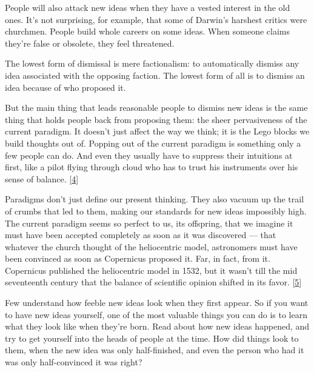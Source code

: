 People will also attack
                  new ideas when they have a vested interest in the old ones.
                  It's not surprising, for example, that some of Darwin's
                  harshest critics were churchmen. People build whole careers on
                  some ideas. When someone claims they're false or obsolete,
                  they feel threatened.

The lowest form of dismissal
                  is mere factionalism: to automatically dismiss any idea
                  associated with the opposing faction. The lowest form of all
                  is to dismiss an idea because of who proposed it.

But
                  the main thing that leads reasonable people to dismiss new
                  ideas is the same thing that holds people back from proposing
                  them: the sheer pervasiveness of the current paradigm. It
                  doesn't just affect the way we think; it is the Lego blocks we
                  build thoughts out of. Popping out of the current paradigm is
                  something only a few people can do. And even they usually have
                  to suppress their intuitions at first, like a pilot flying
                  through cloud who has to trust his instruments over his sense
                  of balance.
                  [\href{\#f4n}{4}]

Paradigms don't just define our present thinking.
                  They also vacuum up the trail of crumbs that led to them,
                  making our standards for new ideas impossibly high. The
                  current paradigm seems so perfect to us, its offspring, that
                  we imagine it must have been accepted completely as soon as it
                  was discovered --- that whatever the church thought of the
                  heliocentric model, astronomers must have been convinced as
                  soon as Copernicus proposed it. Far, in fact, from it.
                  Copernicus published the heliocentric model in 1532, but it
                  wasn't till the mid seventeenth century that the balance of
                  scientific opinion shifted in its favor.
                  [\href{\#f5n}{5}]

Few understand how feeble new ideas look when
                  they first appear. So if you want to have new ideas yourself,
                  one of the most valuable things you can do is to learn what
                  they look like when they're born. Read about how new ideas
                  happened, and try to get yourself into the heads of people at
                  the time. How did things look to them, when the new idea was
                  only half-finished, and even the person who had it was only
                  half-convinced it was right?

